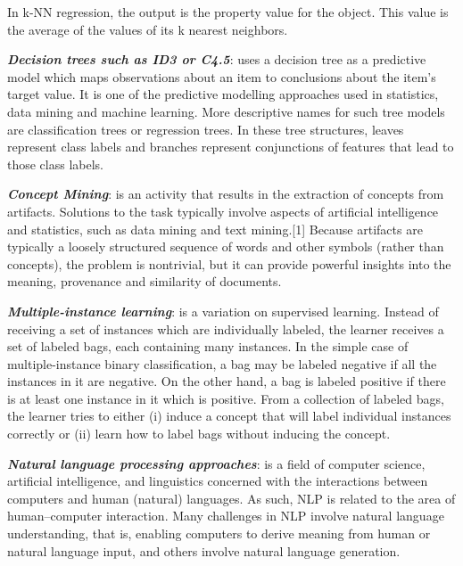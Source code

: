 \documentclass[12pt]{book}
\begin{document}
\begin{enumerate*}
\begin{itemize*}
	  \item In k-NN regression, the output is the property value for the object. This value is the average of the values of its k nearest neighbors.
	\end{itemize*}
  \item \textbf{\textit {Decision trees such as ID3 or C4.5}}: uses a decision tree as a predictive model which maps observations about an item to conclusions about the item's target value. It is one of the predictive modelling approaches used in statistics, data mining and machine learning. More descriptive names for such tree models are classification trees or regression trees. In these tree structures, leaves represent class labels and branches represent conjunctions of features that lead to those class labels.
  \item \textbf{\textit {Concept Mining}}:  is an activity that results in the extraction of concepts from artifacts. Solutions to the task typically involve aspects of artificial intelligence and statistics, such as data mining and text mining.[1] Because artifacts are typically a loosely structured sequence of words and other symbols (rather than concepts), the problem is nontrivial, but it can provide powerful insights into the meaning, provenance and similarity of documents.
  \item \textbf{\textit {Multiple-instance learning}}: is a variation on supervised learning. Instead of receiving a set of instances which are individually labeled, the learner receives a set of labeled bags, each containing many instances. In the simple case of multiple-instance binary classification, a bag may be labeled negative if all the instances in it are negative. On the other hand, a bag is labeled positive if there is at least one instance in it which is positive. From a collection of labeled bags, the learner tries to either (i) induce a concept that will label individual instances correctly or (ii) learn how to label bags without inducing the concept.
  \item \textbf{\textit {Natural language processing approaches}}:  is a field of computer science, artificial intelligence, and linguistics concerned with the interactions between computers and human (natural) languages. As such, NLP is related to the area of human–computer interaction. Many challenges in NLP involve natural language understanding, that is, enabling computers to derive meaning from human or natural language input, and others involve natural language generation.
\end{enumerate*}
\end{document}
